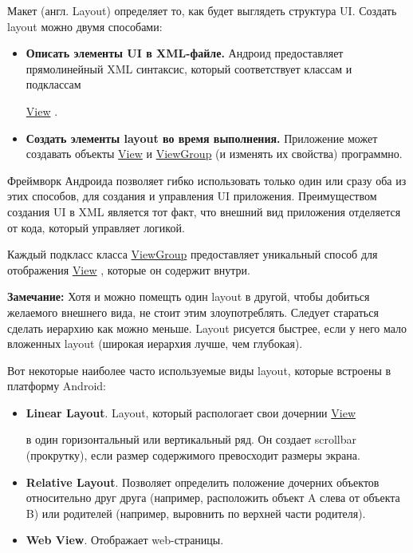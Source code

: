 \newcommand{\View}{
  \href{https://developer.android.com/reference/android/view/View.html}{View}
}

\newcommand{\ViewGroup}{
  \href{https://developer.android.com/reference/android/view/ViewGroup.html}{ViewGroup}
}



Макет (англ. Layout) определяет то, как будет выглядеть структура UI. Создать
layout можно двумя способами:
\begin{itemize}
  \item \textbf{Описать элементы UI в XML-файле.} Андроид предоставляет
  прямолинейный XML синтаксис, который соответствует классам и подклассам
  \View.
  
  \item \textbf{Создать элементы layout во время выполнения.} Приложение может
  создавать объекты \View и \ViewGroup (и изменять их свойства) программно. 
\end{itemize}

Фреймворк Андроида позволяет гибко использовать только один или сразу оба из
этих способов, для создания и управления UI приложения.
Преимуществом создания UI в XML является тот факт, что внешний вид приложения
отделяется от кода, который управляет логикой.


Каждый подкласс класса \ViewGroup предоставляет уникальный способ для
отображения \View, которые он содержит внутри.

\textbf{Замечание:} Хотя и можно помещть один layout в другой, чтобы добиться
желаемого внешнего вида, не стоит этим злоупотреблять. Следует стараться
сделать иерархию как можно меньше. Layout рисуется быстрее, если у него мало
вложенных layout (широкая иерархия лучше, чем глубокая).

Вот некоторые наиболее часто используемые виды layout, которые встроены в
платформу Android:
\begin{itemize}
  \item \textbf{Linear Layout}. Layout, который распологает свои дочернии \View
  в один горизонтальный или вертикальный ряд. Он создает scrollbar (прокрутку),
  если размер содержимого превосходит размеры экрана.
  
  \item \textbf{Relative Layout}. Позволяет определить положение дочерних
  объектов относительно друг друга (например, расположить объект A слева от
  объекта B) или родителей (например, выровнить по верхней части родителя).
  
  \item \textbf{Web View}. Отображает web-страницы.
\end{itemize}

